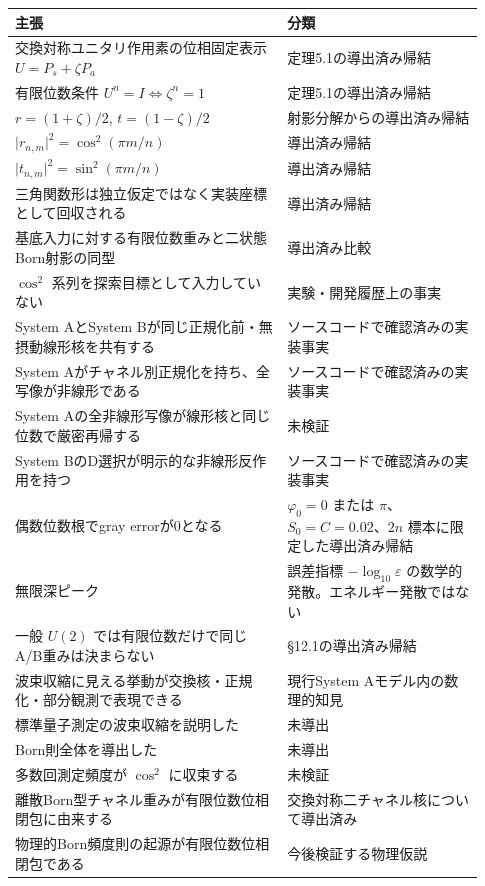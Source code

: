 \documentclass[
  a4paper,
  10pt]{article}
\newcounter{none} %
\begin{document}
{\def\LTcaptype{none} %
\small
\begin{longtable}[]{@{}p{0.54\linewidth}p{0.39\linewidth}@{}}
\toprule\noalign{}
主張 & 分類 \\
\midrule\noalign{}
\endhead
\bottomrule\noalign{}
\endlastfoot
交換対称ユニタリ作用素の位相固定表示 \(U=P_s+\zeta P_a\) &
定理5.1の導出済み帰結 \\
有限位数条件 \(U^n=I\Leftrightarrow\zeta^n=1\) &
定理5.1の導出済み帰結 \\
\(r=(1+\zeta)/2\), \(t=(1-\zeta)/2\) & 射影分解からの導出済み帰結 \\
\(\lvert r_{n,m}\rvert^2=\cos^2(\pi m/n)\) & 導出済み帰結 \\
\(\lvert t_{n,m}\rvert^2=\sin^2(\pi m/n)\) & 導出済み帰結 \\
三角関数形は独立仮定ではなく実装座標として回収される & 導出済み帰結 \\
基底入力に対する有限位数重みと二状態Born射影の同型 & 導出済み比較 \\
\(\cos^2\) 系列を探索目標として入力していない &
実験・開発履歴上の事実 \\
System AとSystem Bが同じ正規化前・無摂動線形核を共有する &
ソースコードで確認済みの実装事実 \\
System Aがチャネル別正規化を持ち、全写像が非線形である &
ソースコードで確認済みの実装事実 \\
System Aの全非線形写像が線形核と同じ位数で厳密再帰する & 未検証 \\
System BのD選択が明示的な非線形反作用を持つ &
ソースコードで確認済みの実装事実 \\
偶数位数根でgray errorが0となる & \(\varphi_0=0\) または
\(\pi\)、\(S_0=C=0.02\)、\(2n\) 標本に限定した導出済み帰結 \\
無限深ピーク & 誤差指標 \(-\log_{10}\varepsilon\)
の数学的発散。エネルギー発散ではない \\
一般 \(U(2)\) では有限位数だけで同じA/B重みは決まらない &
§12.1の導出済み帰結 \\
波束収縮に見える挙動が交換核・正規化・部分観測で表現できる & 現行System
Aモデル内の数理的知見 \\
標準量子測定の波束収縮を説明した & 未導出 \\
Born則全体を導出した & 未導出 \\
多数回測定頻度が \(\cos^2\) に収束する & 未検証 \\
離散Born型チャネル重みが有限位数位相閉包に由来する &
交換対称二チャネル核について導出済み \\
物理的Born頻度則の起源が有限位数位相閉包である & 今後検証する物理仮説 \\
\end{longtable}
}
\end{document}
